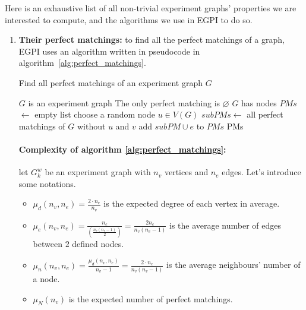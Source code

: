 Here is an exhaustive list of all non-trivial experiment graphs' properties we are interested to compute, and the algorithms we use in EGPI to do so.

\begin{enumerate}
    \item \textbf{Their perfect matchings:} to find all the perfect matchings of a graph, EGPI uses an algorithm written in pseudocode in algorithm~\ref{alg:perfect_matchings}.

        \begin{algorithm}
            \caption{Find all perfect matchings of an experiment graph $G$}
            \label{alg:perfect_matchings}
            \begin{algorithmic}
                \Require $G$ is an experiment graph
                    \State The only perfect matching is $\varnothing$
                \ElsIf
                        {$G$ has nodes}
                    \State $PMs$ $\gets$ empty list
                    \State choose a random node $u \in V(G)$
                        \State $subPMs \gets$ all perfect matchings of $G$ without $u$ and $v$
                                \State add $subPM \cup e$ to $PMs$
                            \EndFor
                        \EndFor
                    \EndFor
                \EndIf
                \State \Return PMs
            \end{algorithmic}
        \end{algorithm}

        \paragraph{Complexity of algorithm \ref{alg:perfect_matchings}:} let $G_k^w$ be an experiment graph with $n_v$ vertices and $n_e$ edges.
        Let's introduce some notations.

        \begin{itemize}
            \item $\mu_d(n_v, n_e) = \frac{2 \cdot n_e}{n_v}$ is the expected degree of each vertex in average.
            \item $\mu_e(n_v, n_e) = \frac{n_e}{\left(\frac{n_v(n_v-1)}{2}\right)} = \frac{2n_e}{n_v(n_v-1)}$ is the average number of edges between $2$ defined nodes.
            \item $\mu_n(n_v, n_e) = \frac{\mu_d(n_v, n_e)}{n_v-1} = \frac{2 \cdot n_e}{n_v(n_v-1)}$ is the average neighbours' number of a node.
            \item $\mu_N(n_v)$ is the expected number of perfect matchings.
        \end{itemize}


\end{enumerate}
